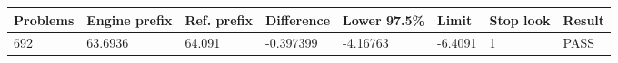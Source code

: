 \begin{tabular}{llllllll}
\toprule
Problems & Engine prefix & Ref. prefix & Difference & Lower 97.5\% & Limit & Stop look & Result \\
\midrule
692 & 63.6936 & 64.091 & -0.397399 & -4.16763 & -6.4091 & 1 & PASS \\
\bottomrule
\end{tabular}
